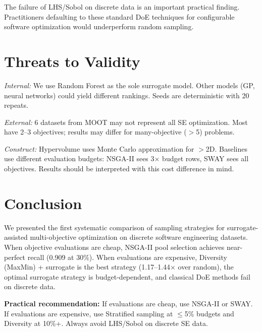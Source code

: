 \documentclass[conference]{IEEEtran}
\begin{document}
The failure of LHS/Sobol on discrete data is an important practical finding. Practitioners defaulting to these standard DoE techniques for configurable software optimization would underperform random sampling.

\section{Threats to Validity}
\label{sec:threats}

\emph{Internal:} We use Random Forest as the sole surrogate model. Other models (GP, neural networks) could yield different rankings. Seeds are deterministic with 20 repeats.

\emph{External:} 6 datasets from MOOT may not represent all SE optimization. Most have 2--3 objectives; results may differ for many-objective ($>$5) problems.

\emph{Construct:} Hypervolume uses Monte Carlo approximation for $>$2D. Baselines use different evaluation budgets: NSGA-II sees 3$\times$ budget rows, SWAY sees all objectives. Results should be interpreted with this cost difference in mind.

\section{Conclusion}
\label{sec:conclusion}

We presented the first systematic comparison of sampling strategies for surrogate-assisted multi-objective optimization on discrete software engineering datasets. When objective evaluations are cheap, NSGA-II pool selection achieves near-perfect recall (0.909 at 30\%). When evaluations are expensive, Diversity (MaxMin) + surrogate is the best strategy (1.17--1.44$\times$ over random), the optimal surrogate strategy is budget-dependent, and classical DoE methods fail on discrete data.

\textbf{Practical recommendation:} If evaluations are cheap, use NSGA-II or SWAY. If evaluations are expensive, use Stratified sampling at $\leq$5\% budgets and Diversity at 10\%+. Always avoid LHS/Sobol on discrete SE data.


\end{document}
